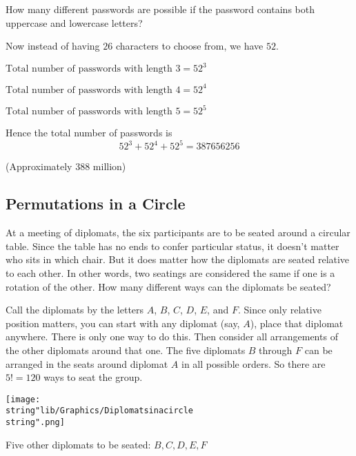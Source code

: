 \documentclass[11pt,a4paper]{book}
\begin{document}
How many different passwords are possible if the password contains
both uppercase and lowercase letters?

Now instead of having $26$ characters to choose from, we have $52$.

$\text{Total number of passwords with length 3}=52^{3}$

$\text{Total number of passwords with length 4}=52^{4}$

$\text{Total number of passwords with length 5}=52^{5}$

Hence the total number of passwords is
\[
52^{3}+52^{4}+52^{5}=387656256
\]

(Approximately 388 million)

\newpage

\subsection{Permutations in a Circle }

\begin{example}

At a meeting of diplomats, the six participants are to be seated around
a circular table. Since the table has no ends to confer particular
status, it doesn't matter who sits in which chair.
But it does matter how the diplomats are seated relative to each other.
In other words, two seatings are considered the same if one is a rotation of the other. How many different ways can the diplomats be seated?

\Solution

Call the diplomats by the letters $A$, $B$, $C$, $D$, $E$, and
$F$. Since only relative position matters, you can start with any
diplomat (say, $A$), place that diplomat anywhere. There is only
one way to do this. Then consider all arrangements of the other diplomats
around that one. The five diplomats $B$ through $F$ can be arranged
in the seats around diplomat $A$ in all possible orders. So there
are $5!=120$ ways to seat the group.

\end{example}

\begin{minipage}{.5\textwidth}
\begin{center}
\texttt{[image: \\string"lib/Graphics/Diplomatsinacircle\\string".png]}
\par\end{center}

\end{minipage}
\begin{minipage}{.5\textwidth}

Five other diplomats to be seated: $B,C,D,E,F$

\end{minipage}
\end{document}
